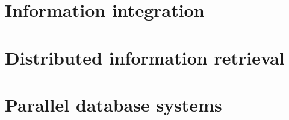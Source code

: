 \documentclass[10pt,a4paper]{article}
\begin{document}
\section{Information integration}

\section{Distributed information retrieval}

\section{Parallel database systems}
	
\end{document}
